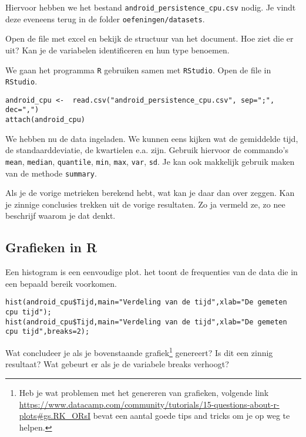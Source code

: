 Hiervoor hebben we het bestand \texttt{android\_persistence\_cpu.csv} nodig. Je vindt deze eveneens terug in de folder \texttt{oefeningen/datasets}.

\begin{exercise}
  \label{oef:casus-akin2016-1var}
	Open de file met excel en bekijk de structuur van het document. Hoe ziet die er uit? Kan je de variabelen identificeren en hun type benoemen. 
\end{exercise}

We gaan het programma \texttt{R} gebruiken samen met \texttt{RStudio}. Open de file in \texttt{RStudio}.

\begin{lstlisting}
android_cpu <-  read.csv("android_persistence_cpu.csv", sep=";", dec=",")
attach(android_cpu)
\end{lstlisting}

We hebben nu de data ingeladen. We kunnen eens kijken wat de gemiddelde tijd, de standaarddeviatie, de kwartielen e.a. zijn. Gebruik hiervoor de commando's \texttt{mean}, \texttt{median}, \texttt{quantile}, \texttt{min}, \texttt{max}, \texttt{var}, \texttt{sd}. Je kan ook makkelijk gebruik maken van de methode \texttt{summary}.

\begin{exercise}
	Als je de vorige metrieken berekend hebt, wat kan je daar dan over zeggen. Kan je zinnige conclusies trekken uit de vorige resultaten. Zo ja vermeld ze, zo nee beschrijf waarom je dat denkt.
\end{exercise}


\subsection{Grafieken in R}


Een histogram is een eenvoudige plot. het toont de frequenties van de data die in een bepaald bereik voorkomen. 

\begin{lstlisting}
hist(android_cpu$Tijd,main="Verdeling van de tijd",xlab="De gemeten cpu tijd");
hist(android_cpu$Tijd,main="Verdeling van de tijd",xlab="De gemeten cpu tijd",breaks=2);
\end{lstlisting}
\begin{exercise}
	Wat concludeer je als je bovenstaande grafiek\footnote{Heb je wat problemen met het genereren van grafieken, volgende link \url{https://www.datacamp.com/community/tutorials/15-questions-about-r-plots\#gs.RK_ORsI} bevat een aantal goede tips and tricks om je op weg te helpen.} genereert? Is dit een zinnig resultaat? Wat gebeurt er als je de variabele breaks verhoogt?
\end{exercise}


